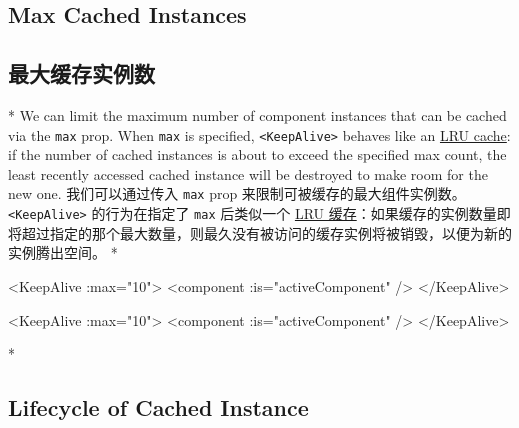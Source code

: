 \begin{paracol}{2}
\subsection{Max Cached Instances}
\switchcolumn
\subsection{最大缓存实例数}
\switchcolumn[0]*%
We can limit the maximum number of component instances that can be
cached via the \texttt{max} prop. When \texttt{max} is specified,
\texttt{\textless{}KeepAlive\textgreater{}} behaves like an
\href{https://en.wikipedia.org/wiki/Cache_replacement_policies\#Least_recently_used_(LRU)}{LRU
cache}: if the number of cached instances is about to exceed the
specified max count, the least recently accessed cached instance will be
destroyed to make room for the new one.
\switchcolumn
我们可以通过传入 \texttt{max} prop
来限制可被缓存的最大组件实例数。\texttt{\textless{}KeepAlive\textgreater{}}
的行为在指定了 \texttt{max} 后类似一个
\href{https://en.wikipedia.org/wiki/Cache_replacement_policies\#Least_recently_used_(LRU)}{LRU
缓存}：如果缓存的实例数量即将超过指定的那个最大数量，则最久没有被访问的缓存实例将被销毁，以便为新的实例腾出空间。
\switchcolumn[0]*%
\begin{codeHtml}
<KeepAlive :max="10">
  <component :is="activeComponent" />
</KeepAlive>
\end{codeHtml}
\switchcolumn
\begin{codeHtml}
<KeepAlive :max="10">
  <component :is="activeComponent" />
</KeepAlive>
\end{codeHtml}
\switchcolumn[0]*%
\subsection{Lifecycle of Cached Instance}
\switchcolumn

\end{paracol}
